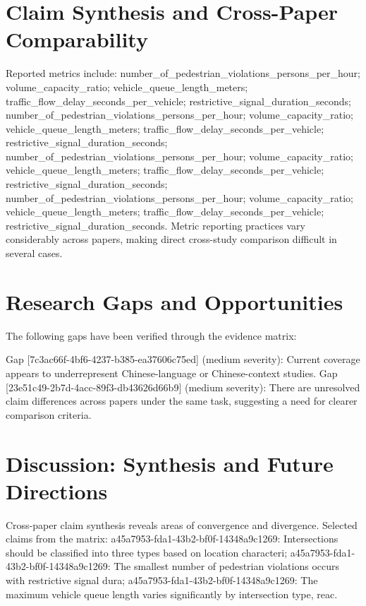 \documentclass{article}
\begin{document}
\section{Claim Synthesis and Cross-Paper Comparability}
Reported metrics include: number_of_pedestrian_violations_persons_per_hour; volume_capacity_ratio; vehicle_queue_length_meters; traffic_flow_delay_seconds_per_vehicle; restrictive_signal_duration_seconds; number_of_pedestrian_violations_persons_per_hour; volume_capacity_ratio; vehicle_queue_length_meters; traffic_flow_delay_seconds_per_vehicle; restrictive_signal_duration_seconds; number_of_pedestrian_violations_persons_per_hour; volume_capacity_ratio; vehicle_queue_length_meters; traffic_flow_delay_seconds_per_vehicle; restrictive_signal_duration_seconds; number_of_pedestrian_violations_persons_per_hour; volume_capacity_ratio; vehicle_queue_length_meters; traffic_flow_delay_seconds_per_vehicle; restrictive_signal_duration_seconds. Metric reporting practices vary considerably across papers, making direct cross-study comparison difficult in several cases.

\section{Research Gaps and Opportunities}
The following gaps have been verified through the evidence matrix:

Gap [7c3ac66f-4bf6-4237-b385-ea37606c75ed] (medium severity): Current coverage appears to underrepresent Chinese-language or Chinese-context studies.
Gap [23e51c49-2b7d-4acc-89f3-db43626d66b9] (medium severity): There are unresolved claim differences across papers under the same task, suggesting a need for clearer comparison criteria.

\section{Discussion: Synthesis and Future Directions}
Cross-paper claim synthesis reveals areas of convergence and divergence. Selected claims from the matrix: a45a7953-fda1-43b2-bf0f-14348a9c1269: Intersections should be classified into three types based on location characteri; a45a7953-fda1-43b2-bf0f-14348a9c1269: The smallest number of pedestrian violations occurs with restrictive signal dura; a45a7953-fda1-43b2-bf0f-14348a9c1269: The maximum vehicle queue length varies significantly by intersection type, reac.
\end{document}
